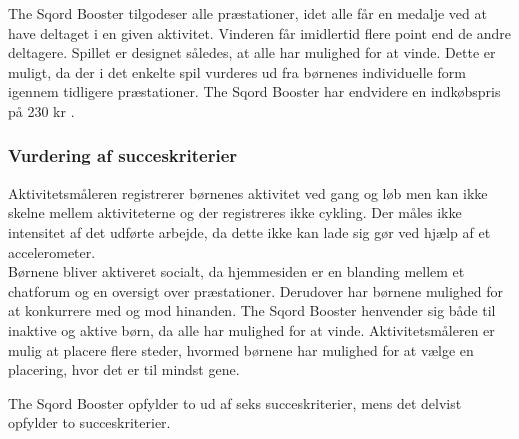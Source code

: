 The Sqord Booster tilgodeser alle præstationer, idet alle får en medalje ved at have deltaget i en given aktivitet. Vinderen får imidlertid flere point end de andre deltagere. Spillet er designet således, at alle har mulighed for at vinde. Dette er muligt, da der i det enkelte spil vurderes ud fra børnenes individuelle form igennem tidligere præstationer. \citep{Sqord_family2015} \newline
The Sqord Booster har endvidere en indkøbspris på 230 kr \citep{Sqord_family2015}. 

\subsubsection{Vurdering af succeskriterier}
Aktivitetsmåleren registrerer børnenes aktivitet ved gang og løb men kan ikke skelne mellem aktiviteterne og der registreres ikke cykling. Der måles ikke intensitet af det udførte arbejde, da dette ikke kan lade sig gør ved hjælp af et accelerometer.\\ %
Børnene bliver aktiveret socialt, da hjemmesiden er en blanding mellem et chatforum og en oversigt over præstationer. Derudover har børnene mulighed for at konkurrere med og mod hinanden. The Sqord Booster henvender sig både til inaktive og aktive børn, da alle har mulighed for at vinde. Aktivitetsmåleren er mulig at placere flere steder, hvormed børnene har mulighed for at vælge en placering, hvor det er til mindst gene.~\citep{Sqord_family2015,Sqord_group2015}

The Sqord Booster opfylder to ud af seks succeskriterier, mens det delvist opfylder to succeskriterier.

